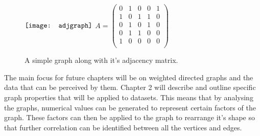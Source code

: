 \begin{figure}[!htb]
\centering
$\vcenter{\hbox{\texttt{[image: adjgraph]}}}$
\hfill
$A = \begin{pmatrix}
0 & 1 & 0 & 0 & 1 \\
1 & 0 & 1 & 1 & 0 \\
0 & 1 & 0 & 1 & 0 \\
0 & 1 & 1 & 0 & 0 \\
1 & 0 & 0 & 0 & 0 \\
\end{pmatrix} $
\caption{A simple graph along with it's adjacency matrix.}
\label{fig:Adjacency Graph}
\end{figure}

The main focus for future chapters will be on weighted directed graphs and the data that can be perceived by them. Chapter 2 will describe and outline specific graph properties that will be applied to datasets. This means that by analysing the graphs, numerical values can be generated to represent certain factors of the graph. These factors can then be applied to the graph to rearrange it's shape so that further correlation can be identified between all the vertices and edges.

